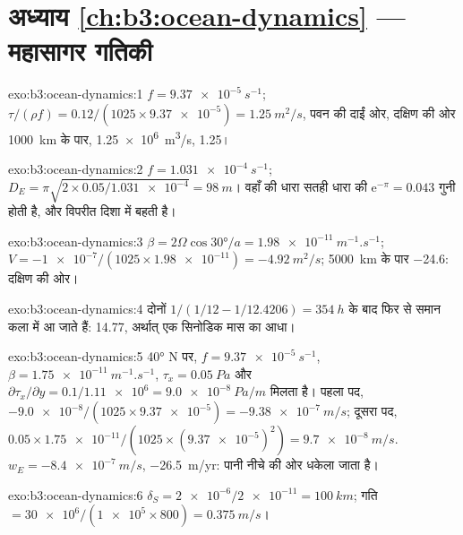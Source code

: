 \section*{अध्याय \ref{ch:b3:ocean-dynamics} --- महासागर गतिकी}

\begin{solution}{exo:b3:ocean-dynamics:1}
$f = \qty{9.37e-5}{s^{-1}}$; $\tau/(\rho f) = 0.12/(1025\times\num{9.37e-5})
= \qty{1.25}{m^2/s}$, पवन की दाईं ओर, दक्षिण की ओर
\qty{1000}{km} के पार, \qty{1.25e6}{m^3/s}, \qty{1.25}{\sverdrup}।
\end{solution}

\begin{solution}{exo:b3:ocean-dynamics:2}
$f = \qty{1.031e-4}{s^{-1}}$; $D_E = \pi\sqrt{2\times0.05/\num{1.031e-4}}
= \qty{98}{m}$। वहाँ की धारा सतही धारा की $\mathrm e^{-\pi} = \num{0.043}$ गुनी होती है,
और विपरीत दिशा में बहती है।
\end{solution}

\begin{solution}{exo:b3:ocean-dynamics:3}
$\beta = 2\Omega\cos\ang{30}/a = \qty{1.98e-11}{m^{-1}.s^{-1}}$; $V =
\num{-1e-7}/(1025\times\num{1.98e-11}) = \qty{-4.92}{m^2/s}$; \qty{5000}{km} के पार
\qty{-24.6}{\sverdrup}: दक्षिण की ओर।
\end{solution}

\begin{solution}{exo:b3:ocean-dynamics:4}
दोनों  $1/(1/12 - 1/12.4206) =
\qty{354}{h}$ के बाद फिर से समान कला में आ जाते हैं: \num{14.77}, अर्थात् एक सिनोडिक मास का आधा।
\end{solution}

\begin{solution}{exo:b3:ocean-dynamics:5}
\ang{40} N पर, $f = \qty{9.37e-5}{s^{-1}}$, $\beta =
\qty{1.75e-11}{m^{-1}.s^{-1}}$, $\tau_x = \qty{0.05}{Pa}$ और
$\partial\tau_x/\partial y = 0.1/\num{1.11e6} = \qty{9.0e-8}{Pa/m}$ मिलता है।
पहला पद, $-\num{9.0e-8}/(1025\times\num{9.37e-5}) =
\qty{-9.38e-7}{m/s}$; दूसरा पद, $0.05\times\num{1.75e-11}/(1025\times
(\num{9.37e-5})^2) = \qty{+9.7e-8}{m/s}$. $w_E = \qty{-8.4e-7}{m/s}$,
\qty{-26.5}{m/yr}: पानी नीचे की ओर धकेला जाता है।
\end{solution}

\begin{solution}{exo:b3:ocean-dynamics:6}
$\delta_S = \num{2e-6}/\num{2e-11} = \qty{100}{km}$; गति $=
\num{30e6}/(\num{1e5}\times800) = \qty{0.375}{m/s}$।
\end{solution}

